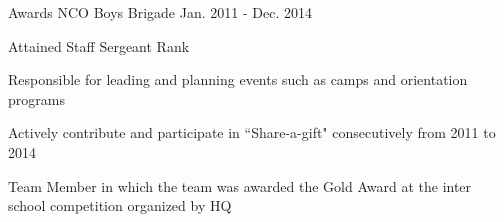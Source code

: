 \begin{cventries}
    \cventry
    {Awards NCO} %
    {Boys Brigade} %
    {Jan. 2011 - Dec. 2014} %
    {} 
    {
      \begin{cvitems} %
        \item {Attained Staff Sergeant Rank}
        \item {Responsible for leading and planning events such as camps and orientation programs}
        \item {Actively contribute and participate in “Share-a-gift" consecutively from 2011 to 2014}
        \item {Team Member in which the team was awarded the Gold Award at the inter school competition organized by HQ}
      \end{cvitems}
    }

\end{cventries}
